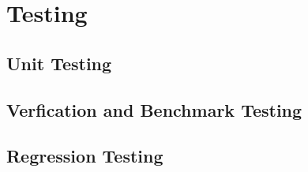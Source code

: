 %
%

\section{Testing}

\subsection{Unit Testing}

\subsection{Verfication and Benchmark Testing}

\subsection{Regression Testing}





